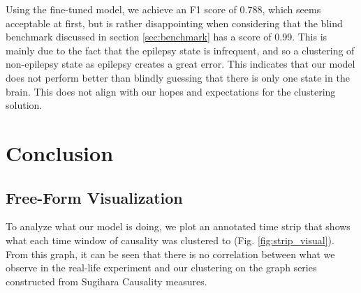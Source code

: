 \documentclass[journal,12pt,onecolumn,draftclsnofoot]{IEEEtran}  %
\begin{document}
Using the fine-tuned model, we achieve an F1 score of 0.788, which seems acceptable at first, but is rather disappointing when considering that the blind benchmark discussed in section \ref{sec:benchmark} has a score of 0.99. This is mainly due to the fact that the epilepsy state is infrequent, and so a clustering of non-epilepsy state as epilepsy creates a great error. This indicates that our model does not perform better than blindly guessing that there is only one state in the brain. This does not align with our hopes and expectations for the clustering solution. 





\section{Conclusion}

\subsection{Free-Form Visualization}
To analyze what our model is doing, we plot an annotated time strip that shows what each time window of causality was clustered to (Fig. \ref{fig:strip_visual}). From this graph, it can be seen that there is no correlation between what we observe in the real-life experiment and our clustering on the graph series constructed from Sugihara Causality measures. 
\end{document}
